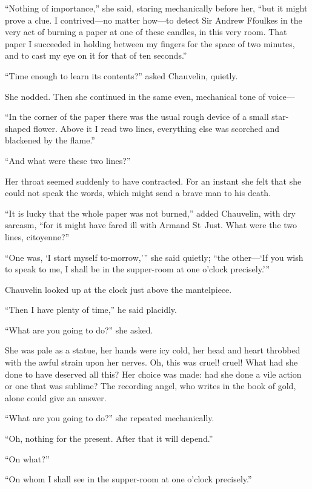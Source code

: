 \enquote{Nothing of importance,} she said, staring mechanically before her, \enquote{but it might prove a clue. I contrived---no matter how---to detect Sir Andrew Ffoulkes in the very act of burning a paper at one of these candles, in this very room. That paper I succeeded in holding between my fingers for the space of two minutes, and to cast my eye on it for that of ten seconds.}

\enquote{Time enough to learn its contents?} asked Chauvelin, quietly.

She nodded. Then she continued in the same even, mechanical tone of voice---

\enquote{In the corner of the paper there was the usual rough device of a small star-shaped flower. Above it I read two lines, everything else was scorched and blackened by the flame.}

\enquote{And what were these two lines?}

Her throat seemed suddenly to have contracted. For an instant she felt that she could not speak the words, which might send a brave man to his death.

\enquote{It is lucky that the whole paper was not burned,} added Chauvelin, with dry sarcasm, \enquote{for it might have fared ill with Armand St~Just. What were the two lines, citoyenne?}

\enquote{One was, \enquote{I start myself to-morrow,}} she said quietly; \enquote{the other---\enquote{If you wish to speak to me, I shall be in the supper-room at one o'clock precisely.}}

Chauvelin looked up at the clock just above the mantelpiece.

\enquote{Then I have plenty of time,} he said placidly.

\enquote{What are you going to do?} she asked.

She was pale as a statue, her hands were icy cold, her head and heart throbbed with the awful strain upon her nerves. Oh, this was cruel! cruel! What had she done to have deserved all this? Her choice was made: had she done a vile action or one that was sublime? The recording angel, who writes in the book of gold, alone could give an answer.

\enquote{What are you going to do?} she repeated mechanically.

\enquote{Oh, nothing for the present. After that it will depend.}

\enquote{On what?}

\enquote{On whom I shall see in the supper-room at one o'clock precisely.}

